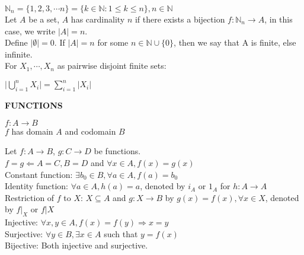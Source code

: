 \documentclass[a4paper]{article}
\begin{document}
\begin{multicols}{2}
\begin{framed}
	\noindent
	$\mathbb{N}_n = \{1,2,3, \cdots n\} = \{k \in \mathbb{N} : 1 \leq k \leq n\}, n \in \mathbb{N}$\\
	Let $A$ be a set, $A$ has cardinality $n$ if there exists a bijection $f : \mathbb{N}_n \rightarrow A$, in this case, we write $\vert A \vert = n$.\\
	
	\noindent
	Define $\vert \emptyset \vert = 0$. If $\vert A \vert = n$ for some $n \in \mathbb{N} \cup \{0\}$, then we say that A is finite, else infinite.\\
	
	\noindent
	For $X_1, \cdots, X_n$ as pairwise disjoint finite sets:
	\begin{center}
		$\vert \bigcup\limits^n_{i=1} X_i \vert = \sum\limits^n_{i=1} \vert X_i \vert$\\
	\end{center}
\end{framed}

\begin{framed}
	\begin{center}
		\textbf{\textsc{FUNCTIONS}}
	\end{center}
	\begin{center}
		$f: A \rightarrow B$\\
		$f$ has domain $A$ and codomain $B$
	\end{center}

	\noindent
	Let $f: A \rightarrow B$, $g: C \rightarrow D$ be functions.\\
	$f = g \Leftarrow A = C, B = D$ and $\forall x \in A, f(x) = g(x)$\\
	
	\noindent
	Constant function: $\exists b_0 \in B, \forall a \in A, f(a) = b_0$\\
	Identity function: $\forall a \in A, h(a) = a$, denoted by $i_A$ or $1_A$ for $h: A \rightarrow A$\\
	
	\noindent
	Restriction of $f$ to $X$: $X \subseteq A$ and $g: X \rightarrow B$ by $g(x) = f(x), \forall x \in X$, denoted by $f \vert_X$ or $f\vert X$\\
	
	\noindent
	Injective: $\forall x, y \in A, f(x) = f(y) \Rightarrow x = y$\\
	Surjective: $\forall y \in B, \exists x \in A$ such that $y = f(x)$\\
	Bijective: Both injective and surjective.\\
	

\end{framed}
\end{multicols}
\end{document}
